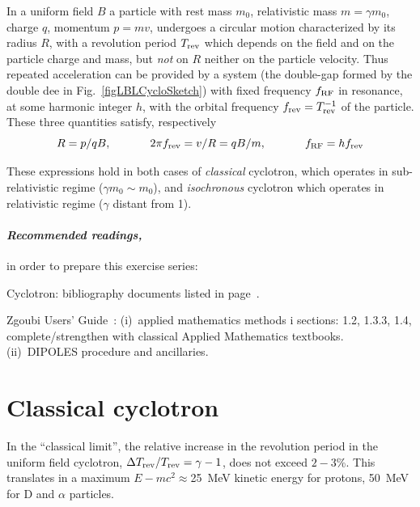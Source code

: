 In a uniform field $B$ a  particle with rest mass $m_0$, 
relativistic mass $m=\gamma m_0$, charge $q$, momentum $p=mv$, undergoes a circular motion
characterized by its radius $R$, with a revolution period $T_{\rm rev}$ which depends on the field 
and on the particle charge and mass, but \emph{not} on $R$ neither on the particle velocity. 
Thus repeated acceleration can be provided by a system (the double-gap formed by the double dee in Fig.~\ref{figLBLCycloSketch}) 
with fixed frequency $f_{\rm RF}$ in resonance, at some harmonic integer $h$, 
 with the orbital frequency $f_{\rm rev}=T^{-1}_{\rm rev}$ of the particle. These three quantities satisfy, respectively 
\begin{equation}
\label{EqRCyclo}
 R = p / qB, \hspace{.1\linewidth} 2\pi f_{\rm rev} = v/R = q B / m, \hspace{.1\linewidth} f_{\rm RF} = h f_{\rm rev}
\end{equation}

These expressions hold in both cases of  \emph{classical} cyclotron, which  operates in 
 sub-relativistic regime ($\gamma m_0\sim m_0$), 
and  \emph{isochronous} cyclotron which operates in  relativistic regime ($\gamma $ distant from 1).  


\paragraph {\sl Recommended readings,} in order to prepare this exercise series:

Cyclotron: bibliography documents listed in page~\pageref{SecBiblioCyclotron}.

Zgoubi Users' Guide~: (i)~applied mathematics methods i sections: 1.2, 1.3.3, 1.4,  
complete/strengthen with classical Applied Mathematics textbooks. (ii)~DIPOLES procedure and ancillaries.



\section{Classical cyclotron \label{secCycloClass}}


In the ``classical limit'', the relative increase in the revolution period in the uniform field cyclotron,
 $\Delta T_{\rm rev}/T_{\rm rev} = \gamma-1 $,  does not exceed $2-3$\%.  
This translates in a maximum $E-mc^2 \approx$25~MeV kinetic energy for protons, 50~MeV for D and $\alpha$ particles. 

